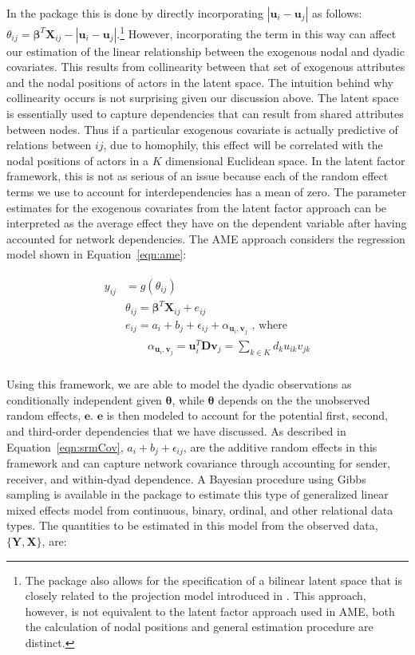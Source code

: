 In the  package this is done by directly incorporating $|\bm u_{i} - \bm u_{j}|$ as follows: $\theta_{ij} = \bm\beta^{T} \mathbf{X}_{ij} - |\bm u_{i} - \bm u_{j}|$.\footnote{The  package also allows for the specification of a bilinear latent space that is closely related to the projection model introduced in \citet{hoff:etal:2002}. This approach, however, is not equivalent to the latent factor approach used in AME, both the calculation of nodal positions and general estimation procedure are distinct.} However, incorporating the term in this way can affect our estimation of the linear relationship between the exogenous nodal and dyadic covariates. This results from collinearity between that set of exogenous attributes and the nodal positions of actors in the latent space. The intuition behind why collinearity occurs is not surprising given our discussion above. The latent space is essentially used to capture dependencies that can result from shared attributes between nodes. Thus if a particular exogenous covariate is actually predictive of relations between $ij$, due to homophily, this effect will be correlated with the nodal positions of actors in a $K$ dimensional Euclidean space. In the latent factor framework, this is not as serious of an issue because each of the random effect terms we use to account for interdependencies has a mean of zero. The parameter estimates for the exogenous covariates from the latent factor approach can be interpreted as the average effect they have on the dependent variable after having accounted for network dependencies. The AME approach considers the regression model shown in Equation~\ref{eqn:ame}:

\begin{align}
\begin{aligned}
	y_{ij} &= g(\theta_{ij}) \\ 
	&\theta_{ij} = \bm\beta^{T} \mathbf{X}_{ij} + e_{ij} \\
	&e_{ij} = a_{i} + b_{j}  + \epsilon_{ij} + \alpha_{\bm u_{i}, \textbf{v}_{j}} \text{  , where } \\
	&\qquad \alpha_{\bm u_{i}, \textbf{v}_{j}} = \bm u_{i}^{T} \textbf{D} \textbf{v}_{j} = \sum_{k \in K} d_{k} u_{ik} v_{jk} \\ 
\label{eqn:ame}
\end{aligned}
\end{align}

Using this framework, we are able to model the dyadic observations as conditionally independent given $\bm\theta$, while $\bm\theta$ depends on the the unobserved random effects, $\mathbf{e}$. $\mathbf{e}$ is then modeled to account for the potential first, second, and third-order dependencies that we have discussed. As described in Equation~\ref{eqn:srmCov}, $a_{i} + b_{j}  + \epsilon_{ij}$, are the additive random effects in this framework and can capture network covariance through accounting for sender, receiver, and within-dyad dependence. A Bayesian procedure using Gibbs sampling is available in the  package to estimate this type of generalized linear mixed effects model from continuous, binary, ordinal, and other relational data types. The quantities to be estimated in this model from the observed data, $\{\mathbf{Y}, \mathbf{X}\}$, are:

